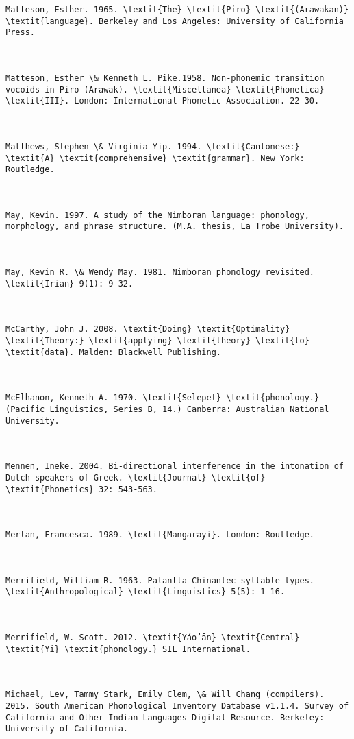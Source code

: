 \begin{verbatim}
Matteson, Esther. 1965. \textit{The} \textit{Piro} \textit{(Arawakan)} \textit{language}. Berkeley and Los Angeles: University of California Press.



Matteson, Esther \& Kenneth L. Pike.1958. Non-phonemic transition vocoids in Piro (Arawak). \textit{Miscellanea} \textit{Phonetica} \textit{III}. London: International Phonetic Association. 22-30.



Matthews, Stephen \& Virginia Yip. 1994. \textit{Cantonese:} \textit{A} \textit{comprehensive} \textit{grammar}. New York: Routledge.



May, Kevin. 1997. A study of the Nimboran language: phonology, morphology, and phrase structure. (M.A. thesis, La Trobe University).



May, Kevin R. \& Wendy May. 1981. Nimboran phonology revisited. \textit{Irian} 9(1): 9-32.



McCarthy, John J. 2008. \textit{Doing} \textit{Optimality} \textit{Theory:} \textit{applying} \textit{theory} \textit{to} \textit{data}. Malden: Blackwell Publishing.



McElhanon, Kenneth A. 1970. \textit{Selepet} \textit{phonology.} (Pacific Linguistics, Series B, 14.) Canberra: Australian National University.



Mennen, Ineke. 2004. Bi-directional interference in the intonation of Dutch speakers of Greek. \textit{Journal} \textit{of} \textit{Phonetics} 32: 543-563.



Merlan, Francesca. 1989. \textit{Mangarayi}. London: Routledge.



Merrifield, William R. 1963. Palantla Chinantec syllable types. \textit{Anthropological} \textit{Linguistics} 5(5): 1-16.



Merrifield, W. Scott. 2012. \textit{Yáo’ān} \textit{Central} \textit{Yi} \textit{phonology.} SIL International.



Michael, Lev, Tammy Stark, Emily Clem, \& Will Chang (compilers). 2015. South American Phonological Inventory Database v1.1.4. Survey of California and Other Indian Languages Digital Resource. Berkeley: University of California.




\end{verbatim}
